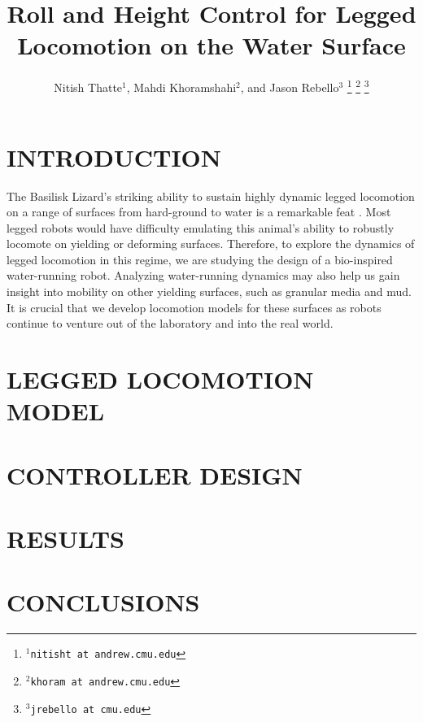 \documentclass[letterpaper, 10 pt, conference]{ieeeconf}  %
\title{\LARGE \bf
    Roll and Height Control for Legged Locomotion on the Water Surface
}
\author{Nitish Thatte$^{1}$, Mahdi Khoramshahi$^{2}$, and Jason Rebello$^{3}$%
\thanks{$^{1}${\tt\small nitisht at andrew.cmu.edu}}%
\thanks{$^{2}${\tt\small khoram at andrew.cmu.edu}}
\thanks{$^{3}${\tt\small jrebello at cmu.edu}}
}
\begin{document}
\maketitle
\thispagestyle{empty}
\pagestyle{empty}

\begin{abstract}
	
\end{abstract}

\section{INTRODUCTION}
The Basilisk Lizard's striking ability to sustain highly dynamic legged locomotion on a range of surfaces from hard-ground to water is a remarkable feat \cite{glasheen1996hydrodynamic}. Most legged robots would have difficulty emulating this animal's ability to robustly locomote on yielding or deforming surfaces. Therefore, to explore the dynamics of legged locomotion in this regime, we are studying the design of a bio-inspired water-running robot. Analyzing water-running dynamics may also help us gain insight into mobility on other yielding surfaces, such as granular media and mud. It is crucial that we develop locomotion models for these surfaces as robots continue to venture out of the laboratory and into the real world.

\section{LEGGED LOCOMOTION MODEL}


\section{CONTROLLER DESIGN}


\section{RESULTS}


\section{CONCLUSIONS}






\end{document}
